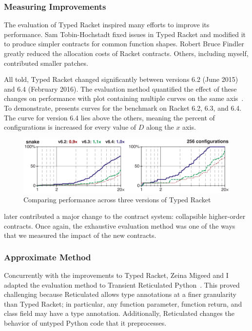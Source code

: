 \subsubsection{Measuring Improvements}

The evaluation of Typed Racket inspired many efforts to improve its performance.
Sam Tobin-Hochstadt fixed issues in Typed Racket and modified it to produce
 simpler contracts for common function shapes.
Robert Bruce Findler greatly reduced the allocation costs of Racket contracts.
Others, including myself, contributed smaller patches.

All told, Typed Racket changed significantly between versions 6.2 (June 2015)
 and 6.4 (February 2016).
The evaluation method quantified the effect of these changes on
 performance with plot containing multiple  curves on the same
 axis~\cite{gtnffvf-jfp-2019}.
To demonstrate,  presents curves for the 
 benchmark on Racket 6.2, 6.3, and 6.4.
The curve for version 6.4 lies above the others, meaning the percent of
  configurations is increased for every value of $D$ along
 the $x$ axis.

\begin{figure}[h]
\includegraphics[width=0.8\columnwidth]{src/snake-jfp.png}
\caption{Comparing performance across three versions of Typed Racket}
\label{fig:snake-jfp}
\end{figure}

 later contributed a major change to the contract system:
 collapsible higher-order contracts.
Once again, the exhaustive evaluation method was one of the ways that we
 measured the impact of the new contracts.


\subsubsection{Approximate Method}

Concurrently with the improvements to Typed Racket, Zeina Migeed and I
 adapted the evaluation method to Transient Reticulated Python~\cite{gm-pepm-2018}.
This proved challenging because Reticulated allows type annotations
 at a finer granularity than Typed Racket; in particular, any function
 parameter, function return, and class field may have a type annotation.
Additionally, Reticulated changes the behavior of untyped Python code that
 it preprocesses.

